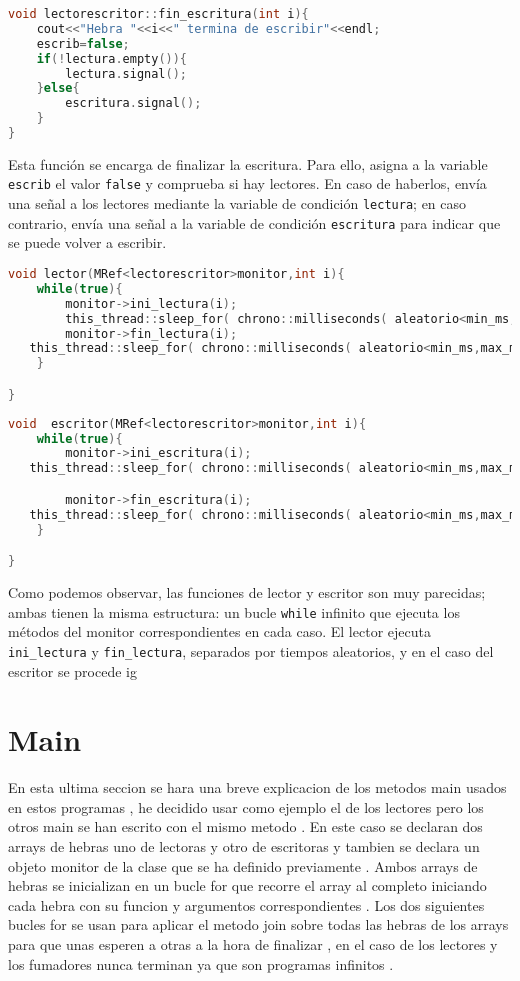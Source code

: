 \documentclass{article}
\begin{document}
\begin{lstlisting}[language=C++,caption=función fin de escritura ] 
void lectorescritor::fin_escritura(int i){
	cout<<"Hebra "<<i<<" termina de escribir"<<endl;
	escrib=false;
	if(!lectura.empty()){
		lectura.signal();
	}else{
		escritura.signal();
	}
}
\end{lstlisting}
Esta función se encarga de finalizar la escritura. Para ello, asigna a la variable \texttt{escrib} el valor \texttt{false} y comprueba si hay lectores. En caso de haberlos, envía una señal a los lectores mediante la variable de condición \texttt{lectura}; en caso contrario, envía una señal a la variable de condición \texttt{escritura} para indicar que se puede volver a escribir.
\begin{lstlisting}[language=C++,caption=función lector] 
void lector(MRef<lectorescritor>monitor,int i){
	while(true){
		monitor->ini_lectura(i);
   		this_thread::sleep_for( chrono::milliseconds( aleatorio<min_ms,max_ms>() ));
		monitor->fin_lectura(i);
   this_thread::sleep_for( chrono::milliseconds( aleatorio<min_ms,max_ms>() ));
	}

}
\end{lstlisting}
\begin{lstlisting}[language=C++,caption=función escritor] 
void  escritor(MRef<lectorescritor>monitor,int i){
	while(true){
		monitor->ini_escritura(i);
   this_thread::sleep_for( chrono::milliseconds( aleatorio<min_ms,max_ms>() ));

		monitor->fin_escritura(i);
   this_thread::sleep_for( chrono::milliseconds( aleatorio<min_ms,max_ms>() ));
	}

}
\end{lstlisting}

Como podemos observar, las funciones de lector y escritor son muy parecidas; ambas tienen la misma estructura: un bucle \texttt{while} infinito que ejecuta los métodos del monitor correspondientes en cada caso. El lector ejecuta \texttt{ini\_lectura} y \texttt{fin\_lectura}, separados por tiempos aleatorios, y en el caso del escritor se procede ig

\section{Main}
En esta ultima seccion se hara una breve explicacion de los metodos main usados en estos programas , he decidido usar como ejemplo el de los lectores pero los otros main se han escrito con el mismo metodo  . En este caso se declaran dos arrays de hebras uno de lectoras y otro de escritoras y tambien se declara un objeto monitor de la clase que se ha definido previamente . Ambos arrays de hebras se inicializan en un bucle for que recorre el array al completo iniciando cada hebra con su funcion y argumentos correspondientes . 
Los dos siguientes bucles for se usan para aplicar el metodo join sobre todas las hebras de los arrays para que unas esperen a otras a la hora de finalizar , en el caso de los lectores y los fumadores  nunca terminan ya que son programas infinitos . 
\end{document}

